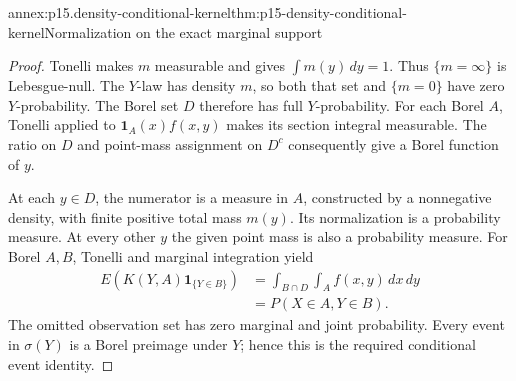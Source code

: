 \begin{annexitem}{annex:p15.density-conditional-kernel}{thm:p15-density-conditional-kernel}{Normalization on the exact marginal support}
\begin{proof}
Tonelli makes \(m\) measurable and gives \(\int m(y)\,dy=1\).
Thus \(\{m=\infty\}\) is Lebesgue-null. The \(Y\)-law has density
\(m\), so both that set and \(\{m=0\}\) have zero \(Y\)-probability.
The Borel set \(D\) therefore has full \(Y\)-probability.
For each Borel \(A\), Tonelli applied to \(\mathbf1_A(x)f(x,y)\)
makes its section integral measurable.
The ratio on \(D\) and point-mass assignment on \(D^c\) consequently
give a Borel function of \(y\).

At each \(y\in D\), the numerator is a measure in \(A\), constructed
by a nonnegative density, with finite positive total mass \(m(y)\).
Its normalization is a probability measure.
At every other \(y\) the given point mass is also a probability measure.
For Borel \(A,B\), Tonelli and marginal integration yield
\[
 \begin{aligned}
 E(K(Y,A)\mathbf1_{\{Y\in B\}})
   &=\int_{B\cap D}\int_A f(x,y)\,dx\,dy\\
   &=P(X\in A,Y\in B).
 \end{aligned}
\]
The omitted observation set has zero marginal and joint probability.
Every event in \(\sigma(Y)\) is a Borel preimage under \(Y\);
hence this is the required conditional event identity.
\end{proof}
\end{annexitem}

